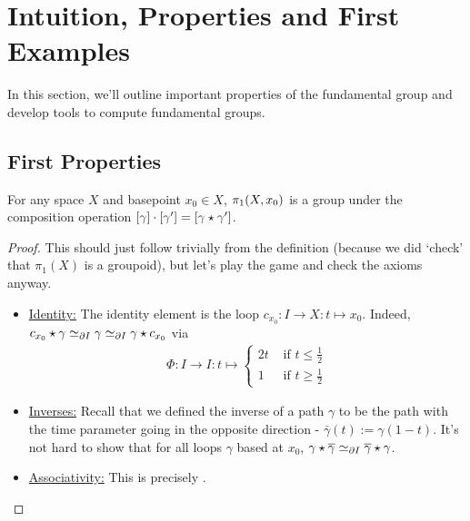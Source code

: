 \section{Intuition, Properties and First Examples}

In this section, we'll outline important properties of the fundamental group and develop tools to compute fundamental groups.

\subsection{First Properties}

\begin{boxtheorem}
    For any space $X$ and basepoint $x_0 \in X$, $\pi_1\!\left( X, x_0 \right)$ is a group under the composition operation $\left[ \gamma \right] \cdot \left[ \gamma' \right] = \left[ \gamma \star \gamma' \right]$.
\end{boxtheorem}
\begin{proof}
    This should just follow trivially from the definition (because we did `check' that $\pi_1(X)$ is a groupoid), but let's play the game and check the axioms anyway.
    \begin{itemize}
        \item \underline{Identity:} The identity element is the loop $c_{x_0} : I \to X : t \mapsto x_0$. Indeed, $c_{x_0} \star \gamma \simeq_{\partial I} \gamma \simeq_{\partial I} \gamma \star c_{x_0}$ via
        \begin{align*}
            \Phi : I \to I : t \mapsto \begin{cases}
                2t & \text{ if } t \leq \frac{1}{2} \\
                1 & \text{ if } t \geq \frac{1}{2}
            \end{cases}
        \end{align*}

        \item \underline{Inverses:} Recall that we defined the inverse of a path $\gamma$ to be the path with the time parameter going in the opposite direction - $\bar{\gamma}(t) := \gamma(1 - t)$. It's not hard to show that for all loops $\gamma$ based at $x_0$, $\gamma \star \overline{\gamma} \simeq_{\partial I} \overline{\gamma} \star \gamma$.

        \item \underline{Associativity:} This is precisely .
    \end{itemize}
\end{proof}

